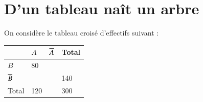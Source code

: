 \documentclass[oneside,12pt]{exam}          %
\begin{document}
\newpage
{}



\section{D'un tableau naît un arbre}
On considère le tableau croisé d'effectifs suivant :
\begin{center}
	\renewcommand{\arraystretch}{1.75}
    \begin{tabular}{| P{4cm} | P{3cm} | P{3cm} | P{3cm} |}\hline
		 & $A$ & ${\overline{A}}$ & Total\\ \hline
	    $B$ & 80 &  &  \\ \hline
	    ${\overline{B}}$ &  &  & 140 \\ \hline
	    Total & 120 &  & 300 \\ \hline
    \end{tabular}
\end{center}
\end{document}
